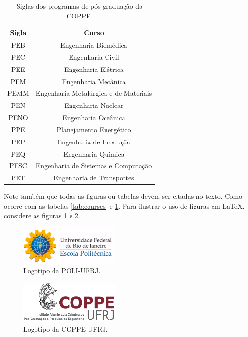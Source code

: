 \documentclass[grad,numbers]{coppe}
\begin{document}
    
  \begin{table}[h]
  	\caption{Siglas dos programas de pós graduação da COPPE.}
  	\label{tab:programs}
  	\centering
  	{\footnotesize
  	\begin{tabular}{|c|c|}
  		\hline
  		Sigla &                 Curso                 \\ \hline
  		 PEB  &         Engenharia Biomédica          \\
  		 PEC  &           Engenharia Civil            \\
  		 PEE  &          Engenharia Elétrica          \\
  		 PEM  &          Engenharia Mecânica          \\
  		PEMM  & Engenharia Metalúrgica e de Materiais \\
  		 PEN  &          Engenharia Nuclear           \\
  		PENO  &          Engenharia Oceânica          \\
  		 PPE  &        Planejamento Energético        \\
  		 PEP  &        Engenharia de Produção         \\
  		 PEQ  &          Engenharia Química           \\
  		PESC  &  Engenharia de Sistemas e Computação  \\
  		 PET  &       Engenharia de Transportes       \\ \hline
  	\end{tabular}}
  \end{table}


  Note também que todas as figuras ou tabelas devem ser citadas no texto. Como ocorre com as tabelas \ref{tab:courses} e \ref{tab:programs}. Para ilustrar o uso de figuras em \LaTeX, considere as figuras \ref{fig:poli} e \ref{fig:coppe}.
  
   \begin{figure}
      \centering
      \includegraphics[width=5cm]{poli-logo.pdf}
      \caption{Logotipo da POLI-UFRJ.}
      \label{fig:poli}
    \end{figure}
    
    
    \begin{figure}
       \centering
       \includegraphics[width=5cm]{coppe-logo.pdf}
       \caption{Logotipo da COPPE-UFRJ.}
       \label{fig:coppe}
     \end{figure}
\end{document}
